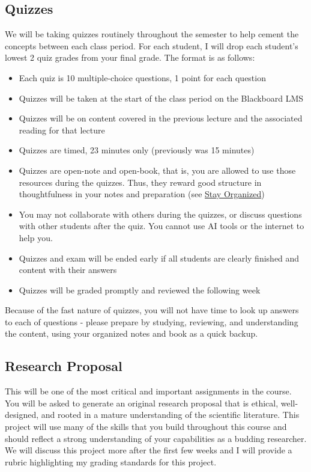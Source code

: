 \documentclass[
  12pt,
  letterpaper,
]{scrartcl}
\providecommand{\tightlist}{%
  \setlength{\itemsep}{0pt}\setlength{\parskip}{0pt}}\usepackage{longtable,booktabs,array}
\begin{document}
\subsection{Quizzes}\label{quizzes}

We will be taking quizzes routinely throughout the semester to help
cement the concepts between each class period. For each student, I will
drop each student's lowest 2 quiz grades from your final grade. The
format is as follows:

\begin{itemize}
\tightlist
\item
  Each quiz is 10 multiple-choice questions, 1 point for each question
\item
  Quizzes will be taken at the start of the class period on the
  Blackboard LMS
\item
  Quizzes will be on content covered in the previous lecture and the
  associated reading for that lecture
\item
  Quizzes are timed, 23 minutes only (previously was 15 minutes)
\item
  Quizzes are open-note and open-book, that is, you are allowed to use
  those resources during the quizzes. Thus, they reward good structure
  in thoughtfulness in your notes and preparation (see
  \hyperref[stay-organized]{Stay Organized})
\item
  You may not collaborate with others during the quizzes, or discuss
  questions with other students after the quiz. You cannot use AI tools
  or the internet to help you.
\item
  Quizzes and exam will be ended early if all students are clearly
  finished and content with their answers
\item
  Quizzes will be graded promptly and reviewed the following week
\end{itemize}

Because of the fast nature of quizzes, you will not have time to look up
answers to each of questions - please prepare by studying, reviewing,
and understanding the content, using your organized notes and book as a
quick backup.

\subsection{Research Proposal}\label{research-proposal}

This will be one of the most critical and important assignments in the
course. You will be asked to generate an original research proposal that
is ethical, well-designed, and rooted in a mature understanding of the
scientific literature. This project will use many of the skills that you
build throughout this course and should reflect a strong understanding
of your capabilities as a budding researcher. We will discuss this
project more after the first few weeks and I will provide a rubric
highlighting my grading standards for this project.
\end{document}
